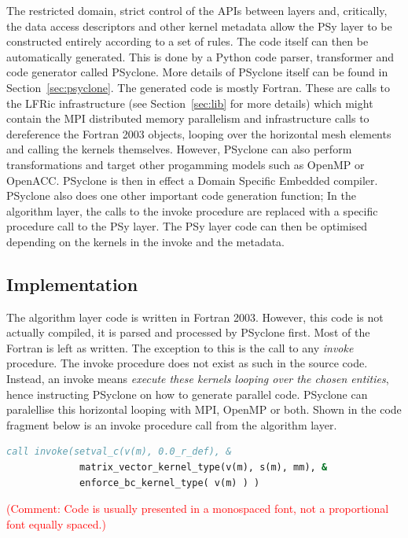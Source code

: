 \documentclass[times]{elsarticle}
\begin{document}
The restricted domain, strict control of the APIs between layers and,
critically, the data access descriptors and other kernel metadata
allow the PSy layer to be constructed entirely according to a set of
rules. The code itself can then be automatically generated. This is
done by a Python code parser, transformer and code generator called
PSyclone. More details of PSyclone itself can be found in
Section~\ref{sec:psyclone}. The generated code is mostly Fortran.
These are calls to the LFRic infrastructure (see Section~\ref{sec:lib} 
for more details) which might contain the
MPI distributed memory parallelism and infrastructure calls
to dereference the Fortran 2003 objects, looping over
the horizontal mesh elements and calling the kernels
themselves. However, PSyclone can also perform transformations and
target other progamming models such as OpenMP or OpenACC. PSyclone is
then in effect a Domain Specific Embedded compiler. PSyclone also does
one other important code generation function; In the algorithm layer,
the calls to the invoke procedure are replaced with a specific
procedure call to the PSy layer. The PSy layer code can then be
optimised depending on the kernels in the invoke and the metadata.

\subsection{\label{sec:sub:implement}Implementation}
The algorithm layer code is written in Fortran 2003. However, this
code is not actually compiled, it is parsed and processed by PSyclone
first. Most of the Fortran is left as written. The exception to this
is the call to any {\em invoke} procedure. The invoke procedure does not 
exist as such in the source code. Instead, an invoke means {\em execute these
kernels looping over the chosen entities}, hence instructing PSyclone on how to 
generate parallel code. PSyclone can paralellise this horizontal looping with MPI,
OpenMP or both. Shown in the code fragment below is an invoke
procedure call from the algorithm layer.

\begin{lstlisting}[language=Fortran,caption={Code fragment showing an
invoke procedure from the Algorithm layer},label={lst:invoke}]
 call invoke(setval_c(v(m), 0.0_r_def), &
             matrix_vector_kernel_type(v(m), s(m), mm), &
             enforce_bc_kernel_type( v(m) ) )
\end{lstlisting}
\textcolor{red}{(Comment: Code is usually presented in a monospaced font, not 
a proportional font equally spaced.)}
\end{document}
